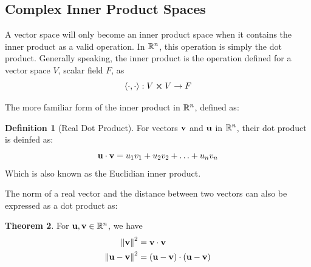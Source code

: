\documentclass[12pt]{article}
\theoremstyle{definition}
\newtheorem{theorem}{Theorem}[section]
\newtheorem{definition}[theorem]{Definition}
\begin{document}
\subsection{Complex Inner Product Spaces}

A vector space will only become an inner product space when it contains the inner product as a valid operation. In $\mathbb{R}^n$, this operation is simply the dot product. Generally speaking, the inner product is the operation defined for a vector space $V$, scalar field $F$, as $$\left\langle \cdot, \cdot \right\rangle: V \cross V \rightarrow F $$

The more familiar form of the inner product in $\mathbb{R}^n$, defined as:

\begin{definition}[Real Dot Product]
    For vectors $\mathbf{v}$ and $\mathbf{u}$ in $\mathbb{R}^n$, their dot product is deinfed as:
    $$\mathbf{u} \cdot \mathbf{v} = u_1 v_1 + u_2 v_2 + \ldots + u_n v_n$$
    Which is also known as the Euclidian inner product.
\end{definition}


The norm of a real vector and the distance between two vectors can also be expressed as a dot product as:

\begin{theorem}
    For $\mathbf{u}, \mathbf{v} \in \mathbb{R}^n$, we have
    \begin{align*}
        \norm{\mathbf{v}}^2 &= \mathbf{v} \cdot \mathbf{v} \\
        \norm{\mathbf{u} - \mathbf{v}}^2 &= (\mathbf{u} - \mathbf{v}) \cdot (\mathbf{u} - \mathbf{v})
    \end{align*}
\end{theorem}
\end{document}
